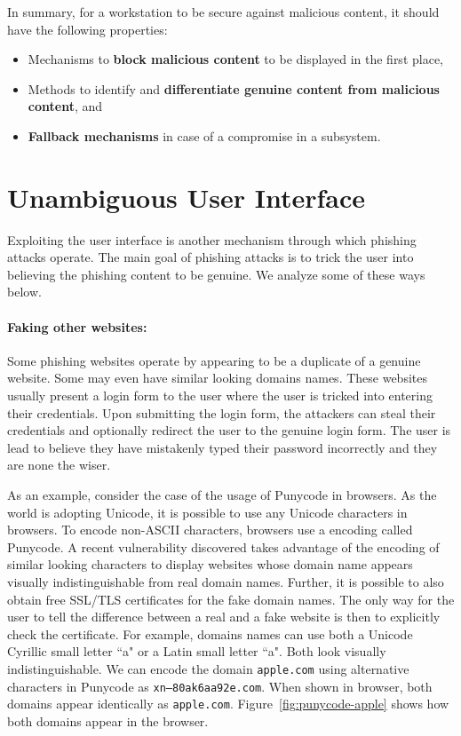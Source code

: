 In summary, for a workstation to be secure against malicious content, it should have the following properties:

\begin{itemize}
    \item Mechanisms to \textbf{block malicious content} to be displayed in the first place,
    \item Methods to identify and \textbf{differentiate genuine content from malicious content}, and
    \item \textbf{Fallback mechanisms} in case of a compromise in a subsystem.
\end{itemize}

\section{Unambiguous User Interface}

Exploiting the user interface is another mechanism through which phishing attacks operate. The main goal of phishing attacks is to trick the user into believing the phishing content to be genuine. We analyze some of these ways below.

\paragraph{Faking other websites:} Some phishing websites operate by appearing to be a duplicate of a genuine website. Some may even have similar looking domains names. These websites usually present a login form to the user where the user is tricked into entering their credentials. Upon submitting the login form, the attackers can steal their credentials and optionally redirect the user to the genuine login form. The user is lead to believe they have mistakenly typed their password incorrectly and they are none the wiser.

As an example, consider the case of the usage of Punycode in browsers. As the world is adopting Unicode, it is possible to use any Unicode characters in browsers. To encode non-ASCII characters, browsers use a encoding called Punycode. A recent vulnerability \cite{punycode-attack} discovered takes advantage of the encoding of similar looking characters to display websites whose domain name appears visually indistinguishable from real domain names. Further, it is possible to also obtain free SSL/TLS certificates for the fake domain names. The only way for the user to tell the difference between a real and a fake website is then to explicitly check the certificate. For example, domains names can use both a Unicode Cyrillic small letter ``a" or a Latin small letter ``a". Both look visually indistinguishable. We can encode the domain {\tt apple.com} using alternative characters in Punycode as {\tt xn--80ak6aa92e.com}. When shown in browser, both domains appear identically as {\tt apple.com}. Figure~\ref{fig:punycode-apple} shows how both domains appear in the browser.

